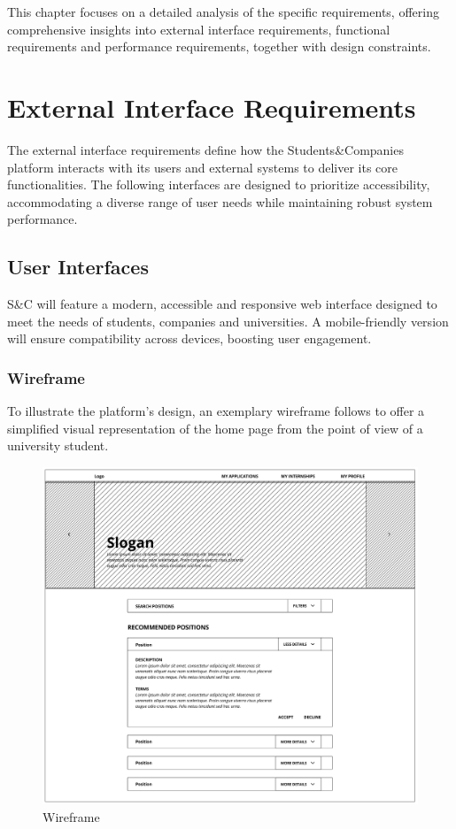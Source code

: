 This chapter focuses on a detailed analysis of the specific requirements, offering comprehensive insights into external interface requirements, functional requirements and performance requirements, together with design constraints.

\section{External Interface Requirements}
The external interface requirements define how the Students\&Companies platform interacts with its users and external systems to deliver its core functionalities.
The following interfaces are designed to prioritize accessibility, accommodating a diverse range of user needs while maintaining robust system performance.

\subsection{User Interfaces}
S\&C will feature a modern, accessible and responsive web interface designed to meet the needs of students, companies and universities.
A mobile-friendly version will ensure compatibility across devices, boosting user engagement.

\subsubsection{Wireframe}
To illustrate the platform’s design, an exemplary wireframe follows to offer a simplified visual representation of the home page from the point of view of a university student.

\begin{figure}
    \centering
    \includegraphics[width=16cm]{images/wireframe.png}
    \caption{Wireframe}
\end{figure}

